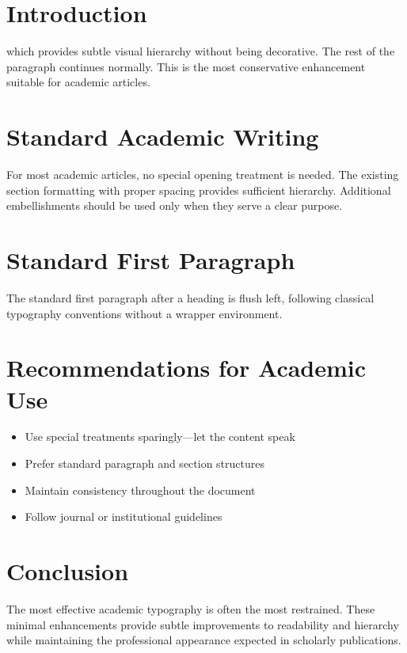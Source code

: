 \documentclass[11pt]{article}
\begin{document}
\section{Introduction}

 which provides subtle visual hierarchy without being decorative. The rest of the paragraph continues normally. This is the most conservative enhancement suitable for academic articles.

\lipsum[1]

\section{Standard Academic Writing}

For most academic articles, no special opening treatment is needed. The existing section formatting with proper spacing provides sufficient hierarchy. Additional embellishments should be used only when they serve a clear purpose.

\lipsum[2]

\section{Standard First Paragraph}

The standard first paragraph after a heading is flush left, following classical typography conventions without a wrapper environment.

\lipsum[3]

\section{Recommendations for Academic Use}

\begin{itemize}
\item Use special treatments sparingly—let the content speak
\item Prefer standard paragraph and section structures
\item Maintain consistency throughout the document
\item Follow journal or institutional guidelines
\end{itemize}

\section{Conclusion}

The most effective academic typography is often the most restrained. These minimal enhancements provide subtle improvements to readability and hierarchy while maintaining the professional appearance expected in scholarly publications.
\end{document}
